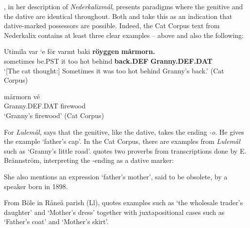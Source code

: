 \citet{Rutberg1924}, in her description of \textit{Nederkalixmål}, presents paradigms where the genitive and the dative are identical throughout. Both \citet[161]{Källskog1992} and \citet[42]{Delsing2003a} take this as an indication that dative-marked possessors are possible. Indeed, the Cat Corpus text from Nederkalix contains at least three clear examples –  above and also the following:

\ea\label{}
\gll Utimila  var  ‘e  för  varmt  baki  \textbf{röyggen} \textbf{mårmorn.}\\
sometimes  be.PST  it  too  hot  behind  \textbf{back.DEF} \textbf{Granny.DEF.DAT}\\
\glt ‘[The cat thought:] Sometimes it was too hot behind Granny’s back.’ (Cat Corpus)
\z

\ea\label{}
\gll mårmorn  vé\\
Granny.DEF.DAT  firewood\\
\glt ‘Granny’s firewood’  (Cat Corpus)
\z

For \textit{Lulemål}, \citet{Nordström1925} says that the genitive, like the dative, takes the ending\textit{ {}-o}. He gives the example  ‘father’s cap’. In the Cat Corpus, there are examples from \textit{Lulemål} such as  ‘Granny’s little road’.  \citet[163]{Källskog1992} quotes two proverbs from transcriptions done by E. Brännström, interpreting the -ending as a dative marker: 

\ea\label{}

\z 
\z

She also mentions an expression  ‘father’s mother’, said to be obsolete, by a speaker born in 1898.

From Böle in Råneå parish (Ll), \citet[113]{Wikberg2004} quotes examples such as  ‘the wholesale trader’s daughter’ and  ‘Mother’s dress’ together with juxtapositional cases such as  ‘Father’s coat’ and  ‘Mother’s skirt’.

